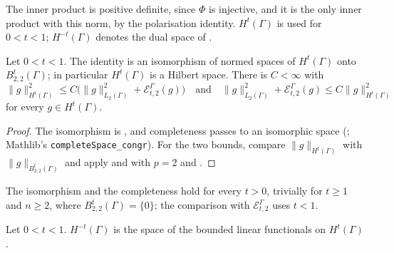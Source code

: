 The inner product is positive definite, since $\Phi$ is injective, and it is the only inner
product with this norm, by the polarisation identity. $H^t(\Gamma)$ is used for $0 < t < 1$;
$H^{-t}(\Gamma)$ denotes the dual space of .

\begin{theorem}
\label{thm:boundary-sobolev-norm}
\leanok
{}
Let $0 < t < 1$. The identity is an isomorphism of normed spaces of $H^t(\Gamma)$ onto
$B^t_{2,2}(\Gamma)$; in particular $H^t(\Gamma)$ is a Hilbert space. There is $C < \infty$ with
\[
  \|g\|_{H^t(\Gamma)}^2 \leq C \bigl(\|g\|_{L_2(\Gamma)}^2 + \mathcal{E}^\Gamma_{t,2}(g)\bigr)
  \quad\text{and}\quad
  \|g\|_{L_2(\Gamma)}^2 + \mathcal{E}^\Gamma_{t,2}(g) \leq C \|g\|_{H^t(\Gamma)}^2
\]
for every $g \in H^t(\Gamma)$.
\end{theorem}

\begin{proof}
\leanok
The isomorphism is , and completeness passes to an
isomorphic space (; Mathlib's
\texttt{completeSpace\_\allowbreak congr}). For the two bounds, compare
$\|g\|_{H^t(\Gamma)}$ with $\|g\|_{B^t_{2,2}(\Gamma)}$ and apply
 and  with $p = 2$ and
.
\end{proof}

The isomorphism and the completeness hold for every $t > 0$, trivially for $t \geq 1$ and
$n \geq 2$, where $B^t_{2,2}(\Gamma) = \{0\}$; the comparison with $\mathcal{E}^\Gamma_{t,2}$ uses
$t < 1$.

\begin{definition}
\label{def:dual-boundary-sobolev}
\leanok
{}
Let $0 < t < 1$. $H^{-t}(\Gamma)$ is the space of the bounded linear functionals on
$H^t(\Gamma)$.
\end{definition}

